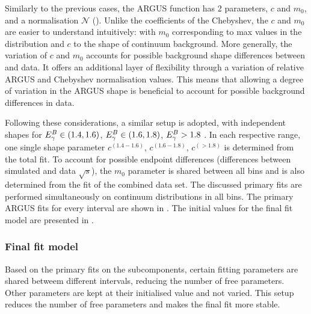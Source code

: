 Similarly to the previous cases, the ARGUS function has 2 parameters, $c$ and $m_0$, and a normalisation $\mathcal{N}$ ().
Unlike the coefficients of the Chebyshev, the $c$ and $m_0$ are easier to understand intuitively: with $m_0$ corresponding to max \Mbc values in the distribution and $c$ to the shape of continuum background.
More generally, the variation of $c$ and $m_0$ accounts for possible background shape differences between \MC and data.
It offers an additional layer of flexibility through a variation of relative ARGUS and Chebyshev normalisation values.
This means that allowing a degree of variation in the ARGUS shape is beneficial to account for possible background differences in data.

Following these considerations, a similar setup is adopted, with independent shapes for  ${E^B_{\gamma}}\in(1.4,1.6)$, ${E^B_{\gamma}}\in(1.6,1.8)$, ${E^B_{\gamma}}>1.8$ \gev.
In each respective range, one single shape parameter $c^{(1.4-1.6)}$, $c^{(1.6-1.8)}$, $c^{(>1.8)}$ is determined from the total fit.
To account for possible endpoint differences (differences between simulated and data $\sqrt{s}$), the $m_0$ parameter is shared between all bins and is also determined from the fit of the combined data set.
The discussed primary fits are performed simultaneously on continuum \Mbc distributions in all \EB bins.
The primary ARGUS fits for every \EB interval are shown in .
The initial values for the final \Mbc fit model are presented in .

\subsubsection{Final fit model}

Based on the primary fits on the subcomponents,
certain fitting parameters are shared betweem different \EB intervals, reducing the number of free parameters.
Other parameters are kept at their initialised value and not varied.
This setup reduces the number of free parameters and makes the final \Mbc fit more stable.

